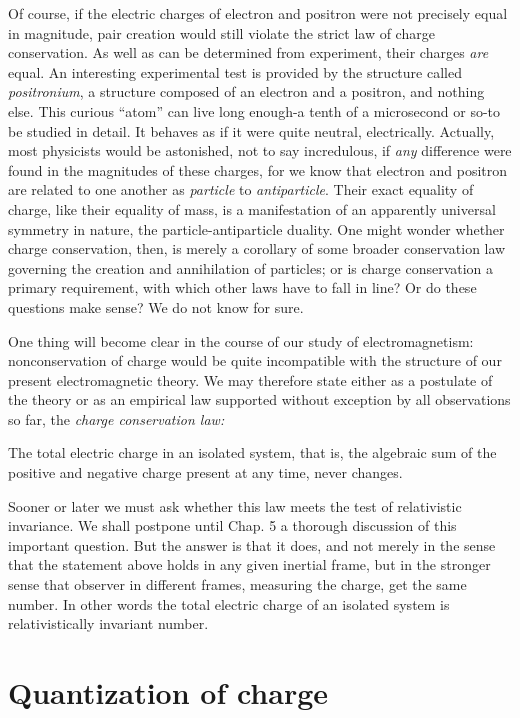 Of course, if the electric charges of electron and positron
were not precisely equal in magnitude, pair creation would still violate the
strict law of charge conservation. As well as can be determined from
experiment, their charges \emph{are} equal. An interesting experimental test is
provided by the structure called \emph{positronium}, a structure composed of an
electron and a positron, and nothing else. This curious ``atom'' can live long
enough-a tenth of a microsecond or so-to be studied in detail. It behaves as if
it were quite neutral, electrically. Actually, most physicists would be
astonished, not to say incredulous, if \emph{any} difference were found in the
magnitudes of these charges, for we know that electron and positron are related
to one another as \emph{particle} to \emph{antiparticle}. Their exact equality
of charge, like their equality of mass, is a manifestation of an apparently
universal symmetry in nature, the particle-antiparticle duality. One might
wonder whether charge conservation, then, is merely a corollary of some broader
conservation law governing the creation and annihilation of particles; or is
charge conservation a primary requirement, with which other laws have to fall
in line? Or do these questions make sense? We do not know for sure. 

One thing will become clear in the course of our study of
electromagnetism: nonconservation of charge would be quite incompatible with
the structure of our present electromagnetic theory. We may therefore state
either as a postulate of the theory or as an empirical law supported without
exception by all observations so far, the \emph{charge conservation law:}

The total electric charge in an isolated system, that is, the
algebraic sum of the positive and negative charge present at any time, never
changes. 

Sooner or later we must ask whether this law meets the test
of relativistic invariance. We shall postpone until Chap. 5 a thorough
discussion of this important question. But the answer is that it does, and not
merely in the sense that the statement above holds in any given inertial frame,
but in the stronger sense that observer in different frames, measuring the
charge, get the same number. In other words the total electric charge of an
isolated system is relativistically invariant number. 

\section{Quantization of charge}

